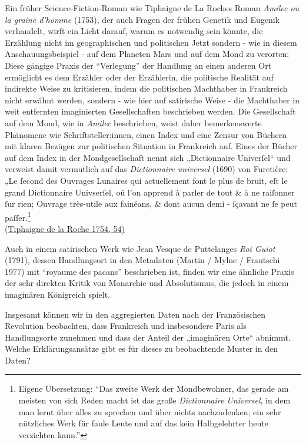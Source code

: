 \documentclass[
  12pt,
  letterpaper,
  DIV=11,
  numbers=noendperiod]{scrreprt}
\begin{document}
Ein früher Science-Fiction-Roman wie Tiphaigne de La Roches Roman
\emph{Amilec ou la graine d'homme} (1753), der auch Fragen der frühen
Genetik und Eugenik verhandelt, wirft ein Licht darauf, warum es
notwendig sein könnte, die Erzählung nicht im geographischen und
politischen Jetzt sondern - wie in diesem Anschauungsbeispiel - auf dem
Planeten Mars und auf dem Mond zu verorten: Diese gängige Praxis der
``Verlegung'' der Handlung an einen anderen Ort ermöglicht es dem
Erzähler oder der Erzählerin, die politische Realität auf indirekte
Weise zu kritisieren, indem die politischen Machthaber in Frankreich
nicht erwähnt werden, sondern - wie hier auf satirische Weise - die
Machthaber in weit entfernten imaginierten Gesellschaften beschrieben
werden. Die Gesellschaft auf dem Mond, wie in \emph{Amilec} beschrieben,
weist daher bemerkenswerte Phänomene wie Schriftsteller:innen, einen
Index und eine Zensur von Büchern mit klaren Bezügen zur politischen
Situation in Frankreich auf. Eines der Bücher auf dem Index in der
Mondgesellschaft nennt sich „Dictionnaire Univerſel`` und verweist damit
vermutlich auf das \emph{Dictionnaire universel} (1690) von Furetière:\\
„Le ſecond des Ouvrages Lunaires qui actuellement font le plus de bruit,
eſt le grand Dictionnaire Univserſel, oû l'on apprend à parler de tout
\& à ne raiſonner ſur rien; Ouvrage très-utile aux fainéans, \& dont
aucun demi - ſçavant ne ſe peut paſſer.\footnote{Eigene Übersetzung:
  ``Das zweite Werk der Mondbewohner, das gerade am meisten von sich
  Reden macht ist das große \emph{Dictionnaire Universel}, in dem man
  lernt über alles zu sprechen und über nichts nachzudenken; ein sehr
  nützliches Werk für faule Leute und auf das kein Halbgelehrter heute
  verzichten kann.''}\\
\href{https://www.zotero.org/google-docs/?broken=BFAGGv}{(Tiphaigne de
la Roche 1754, 54)}

Auch in einem satirischen Werk wie Jean Vesque de Puttelanges \emph{Roi
Guiot} (1791), dessen Handlungsort in den Metadaten (Martin / Mylne /
Frautschi 1977) mit ``royaume des pacans'' beschrieben ist, finden wir
eine ähnliche Praxis der sehr direkten Kritik von Monarchie und
Absolutismus, die jedoch in einem imaginären Königreich spielt.

Insgesamt können wir in den aggregierten Daten nach der Französischen
Revolution beobachten, dass Frankreich und insbesondere Paris als
Handlungsorte zunehmen und dass der Anteil der „imaginären Orte``
abnimmt. Welche Erklärungsansätze gibt es für dieses zu beobachtende
Muster in den Daten?
\end{document}
